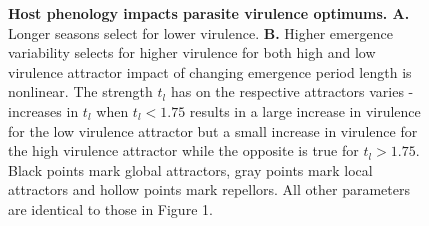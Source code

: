 \documentclass{article}
\begin{document}
\begin{figure}[hb!]
  \centering
    \begin{subfigure}[t]{0.45\textwidth}
      \centering
  \end{subfigure}\hspace{1cm}
  \begin{subfigure}[t]{0.45\textwidth}\hspace{0cm}
  \end{subfigure}\hspace{1.5cm}
    \caption{\textbf{Host phenology impacts parasite virulence optimums. A.} Longer seasons select for lower virulence. \textbf{B.} Higher emergence variability selects for higher virulence for both high and low virulence attractor impact of changing emergence period length is nonlinear. The strength $t_{l}$ has on the respective attractors varies - increases in $t_{l}$ when $t_{l}< 1.75$ results in a large increase in virulence for the low virulence attractor but a small increase in virulence for the high virulence attractor while the opposite is true for $t_{l}> 1.75$. Black points mark global attractors, gray points mark local attractors and hollow points mark repellors. All other parameters are identical to those in Figure 1.
    }
\end{figure}
\end{document}

